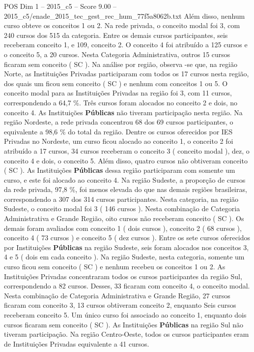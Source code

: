 \begin{textsample}{POS Dim 1 – 2015\_c5 – Score 9.00 – 2015\_c5/enade\_2015\_tec\_gest\_rec\_hum\_77f5a8062b.txt}
Além disso, nenhum curso obteve os conceitos 1 ou 2.
Na rede privada, o conceito modal foi 3, com 240 cursos dos 515 da categoria.
Entre os demais cursos participantes, seis receberam conceito 1, e 109, conceito 2.
O conceito 4 foi atribuído a 125 cursos e o conceito 5, a 20 cursos.
Nesta Categoria Administrativa, outros 15 cursos ficaram sem conceito ( SC ).
Na análise por região, observa -se que, na região Norte, as Instituições Privadas participaram com todos os 17 cursos nesta região, dos quais um ficou sem conceito ( SC ) e nenhum com conceitos 1 ou 5.
O conceito modal para as Instituições Privadas na região foi 3, com 11 cursos, correspondendo a 64,7 \%.
Três cursos foram alocados no conceito 2 e dois, no conceito 4.
As Instituições \textbf{Públicas} não tiveram participação nesta região.
Na região Nordeste, a rede privada concentrou 68 dos 69 cursos participantes, o equivalente a 98,6 \% do total da região.
Dentre os cursos oferecidos por IES Privadas no Nordeste, um curso ficou alocado ao conceito 1, o conceito 2 foi atribuído a 17 cursos, 34 cursos receberam o conceito 3 ( conceito modal ), dez, o conceito 4 e dois, o conceito 5.
Além disso, quatro cursos não obtiveram conceito ( SC ).
As Instituições \textbf{Públicas} dessa região participaram com somente um curso, e este foi alocado ao conceito 4.
Na região Sudeste, a proporção de cursos da rede privada, 97,8 \%, foi menos elevada do que nas demais regiões brasileiras, correspondendo a 307 dos 314 cursos participantes.
Nesta categoria, na região Sudeste, o conceito modal foi 3 ( 146 cursos ).
Nesta combinação de Categoria Administrativa e Grande Região, oito cursos não receberam conceito ( SC ).
Os demais foram avaliados com conceito 1 ( dois cursos ), conceito 2 ( 68 cursos ), conceito 4 ( 73 cursos ) e conceito 5 ( dez cursos ).
Entre os sete cursos oferecidos por Instituições \textbf{Públicas} na região Sudeste, seis foram alocados nos conceitos 3, 4 e 5 ( dois em cada conceito ).
Na região Sudeste, nesta categoria, somente um curso ficou sem conceito ( SC ) e nenhum recebeu os conceitos 1 ou 2.
As Instituições Privadas concentraram todos os cursos participantes da região Sul, correspondendo a 82 cursos.
Desses, 33 ficaram com conceito 4, o conceito modal.
Nesta combinação de Categoria Administrativa e Grande Região, 27 cursos ficaram com conceito 3, 13 cursos obtiveram conceito 2, enquanto Seis cursos receberam conceito 5.
Um único curso foi associado ao conceito 1, enquanto dois cursos ficaram sem conceito ( SC ).
As Instituições \textbf{Públicas} na região Sul não tiveram participação.
Na região Centro-Oeste, todos os cursos participantes eram de Instituições Privadas equivalente a 41 cursos.

\end{textsample}
